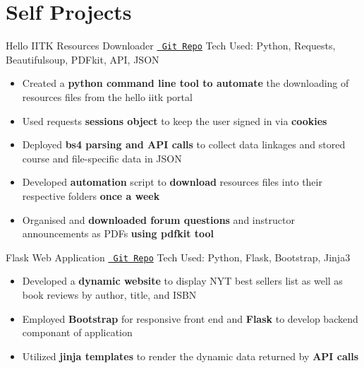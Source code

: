 \section*{\sc Self Projects}
\vspace{-2mm}
\hrulefill
\vspace{1mm}

\excventry
{Hello IITK Resources Downloader}
{{\texttt{\href{https://github.com/sunil-dhaka/autodownloader-helloiitk}{\faGithub{} Git Repo}}}}
{Tech Used: Python, Requests, Beautifulsoup, PDFkit, API, JSON}
{
\begin{itemize}
    \item Created a \textbf{python command line tool to automate} the downloading of resources files from the hello iitk portal 
    \item Used requests \textbf{sessions object} to keep the user signed in via \textbf{cookies}
    \item Deployed \textbf{bs4 parsing and API calls} to collect data linkages and stored course and file-specific data in JSON
    \item Developed \textbf{automation} script to \textbf{download} resources files into their respective folders \textbf{once a week}
    \item Organised and \textbf{downloaded forum questions} and instructor announcements as PDFs \textbf{using pdfkit tool}
\end{itemize}
}
\excventry
{Flask Web Application  \href{https://www.youtube.com/watch?v=JlubCZitXRE}{\faYoutubePlay{}}}
{\texttt{\href{https://github.com/sunil-dhaka/flask-apps}{\faGithub{} Git Repo}}}
{Tech Used: Python, Flask, Bootstrap, Jinja3}
{
\begin{itemize}
    \item Developed a \textbf{dynamic website} to display NYT best sellers list as well as book reviews by author, title, and ISBN%
    \item Employed \textbf{Bootstrap} for responsive front end and \textbf{Flask} to develop backend componant of application
    \item Utilized \textbf{jinja templates} to render the dynamic data returned by \textbf{API calls}
\end{itemize}
}
\vspace{-2mm}